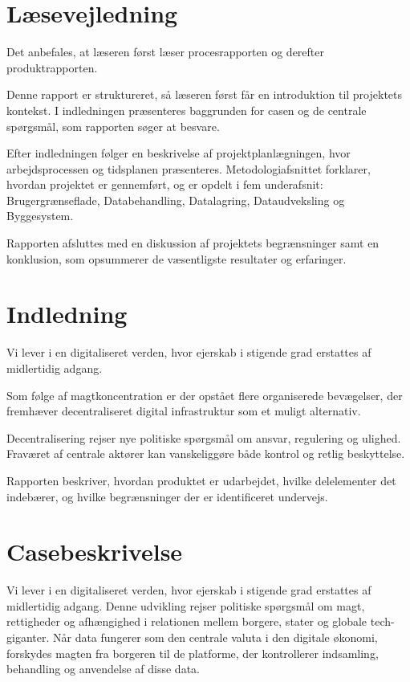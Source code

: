 \documentclass{article}
\begin{document}
\section{Læsevejledning}
Det anbefales, at læseren først læser procesrapporten og derefter produktrapporten.

Denne rapport er struktureret, så læseren først får en introduktion til
projektets kontekst. I indledningen præsenteres baggrunden for casen
og de centrale spørgsmål, som rapporten søger at besvare.

Efter indledningen følger en beskrivelse af projektplanlægningen, hvor
arbejdsprocessen og tidsplanen præsenteres.
Metodologiafsnittet forklarer, hvordan projektet er gennemført, og er
opdelt i fem underafsnit: Brugergrænseflade, Databehandling, Datalagring, Dataudveksling og Byggesystem.

Rapporten afsluttes med en diskussion af projektets begrænsninger samt en
konklusion, som opsummerer de væsentligste resultater og erfaringer.

\section{Indledning}
Vi lever i en digitaliseret verden, hvor ejerskab i stigende grad erstattes af
midlertidig adgang.

Som følge af magtkoncentration er der opstået flere organiserede bevægelser, der
fremhæver decentraliseret digital infrastruktur som et muligt alternativ.

Decentralisering rejser nye politiske spørgsmål om ansvar, regulering og ulighed.
Fraværet af centrale aktører kan vanskeliggøre både kontrol og retlig beskyttelse.

Rapporten beskriver, hvordan produktet er udarbejdet, hvilke delelementer det
indebærer, og hvilke begrænsninger der er identificeret undervejs.

\section{Casebeskrivelse}
Vi lever i en digitaliseret verden, hvor ejerskab i stigende grad
erstattes af midlertidig adgang. Denne udvikling rejser politiske
spørgsmål om magt, rettigheder og afhængighed i relationen mellem
borgere, stater og globale tech-giganter. Når data fungerer som den
centrale valuta i den digitale økonomi, forskydes magten fra borgeren
til de platforme, der kontrollerer indsamling, behandling og
anvendelse af disse data.
\end{document}
